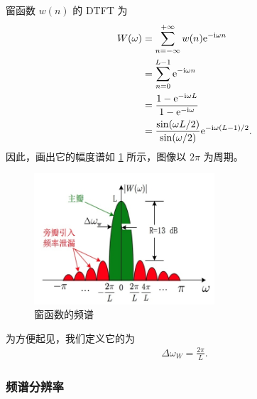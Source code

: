 \begin{example}[窗函数的频谱与主瓣宽度]
    窗函数 $w(n)$ 的 DTFT 为
    \begin{align*}
        W(\omega) & = \sum_{n = -\infty}^{+\infty}w(n) \mathrm{e}^{-\mathrm{i}\omega n} \\
        & = \sum_{n = 0}^{L-1}\mathrm{e}^{-\mathrm{i}\omega n} \\
        & = \frac{1 - \mathrm{e}^{-\mathrm{i}\omega L}}{1 - \mathrm{e}^{-\mathrm{i}\omega}} \\
        & = \frac{\sin(\omega L/2)}{\sin(\omega/2)}\mathrm{e}^{-\mathrm{i}\omega(L-1)/2}.
    \end{align*}
    因此，画出它的幅度谱如 \ref{fig:DTFT_window.png} 所示，图像以 $2\pi$ 为周期。
    \begin{figure}[H]
        \centering
        \includegraphics[width=0.6\textwidth]{chap3/img/DTFT_window.png}
        \caption{窗函数的频谱}
        \label{fig:DTFT_window.png}
    \end{figure}
    为方便起见，我们定义它的为
    \begin{align*}
        \Delta\omega_W = \frac{2\pi}{L}.
    \end{align*}
\end{example}

\subsubsection{频谱分辨率}

